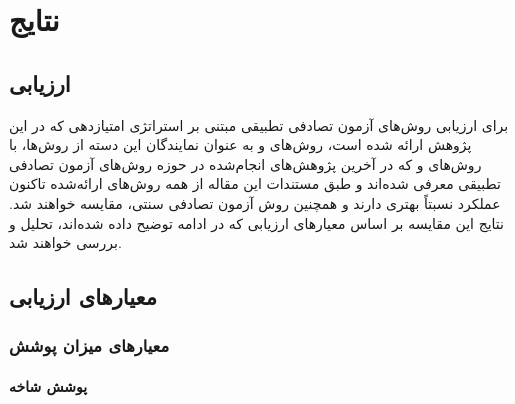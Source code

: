 \chapter{نتایج}

\section{ارزیابی}
برای ارزیابی روش‌های آزمون تصادفی تطبیقی مبتنی بر استراتژی امتیازدهی که در این پژوهش ارائه شده است، روش‌های  و  به عنوان نمایندگان این دسته از روش‌ها، با روش‌های  و  که در آخرین پژوهش‌های انجام‌شده در حوزه روش‌های آزمون تصادفی تطبیقی معرفی شده‌اند و طبق مستندات این مقاله از همه روش‌های ارائه‌شده تاکنون عملکرد نسبتاً بهتری دارند و همچنین روش آزمون تصادفی سنتی، مقایسه خواهند شد. نتایج این مقایسه بر اساس معیارهای ارزیابی که در ادامه توضیح داده شده‌اند، تحلیل و بررسی خواهند شد.

\section{معیارهای ارزیابی}

\subsection{معیارهای میزان پوشش}

\subsubsection{پوشش شاخه}

